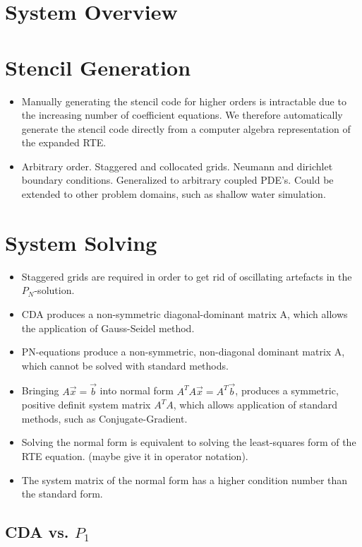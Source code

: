 \section{System Overview}
\section{Stencil Generation}
\begin{itemize}
  \item Manually generating the stencil code for higher orders is intractable due to the increasing number of coefficient equations. We therefore automatically generate the stencil code directly from a computer algebra representation of the expanded RTE.
  \item Arbitrary order. Staggered and collocated grids. Neumann and dirichlet boundary conditions. Generalized to arbitrary coupled PDE's. Could be extended to other problem domains, such as shallow water simulation.
\end{itemize}


\section{System Solving}

\begin{itemize}
  \item Staggered grids are required in order to get rid of oscillating artefacts in the $P_N$-solution.
  \item CDA produces a non-symmetric diagonal-dominant matrix A, which allows the application of Gauss-Seidel method.
  \item PN-equations produce a non-symmetric, non-diagonal dominant matrix A, which cannot be solved with standard methods.
  \item Bringing $A\vec{x}=\vec{b}$ into normal form $A^TA\vec{x}=A^T\vec{b}$, produces a symmetric, positive definit system matrix $A^TA$, which allows application of standard methods, such as Conjugate-Gradient.
  \item Solving the normal form is equivalent to solving the least-squares form of the RTE equation. (maybe give it in operator notation).
  \item The system matrix of the normal form has a higher condition number than the standard form.
\end{itemize}

\subsection*{CDA vs. $P_1$}

